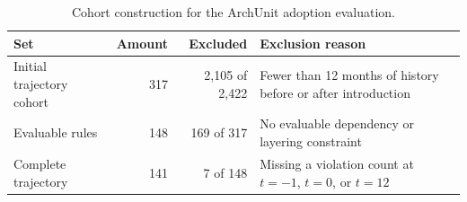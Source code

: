 \begin{table}[t]
\centering
\caption{Cohort construction for the ArchUnit adoption evaluation.}
\label{tab:rq4_cohort}
\small
\setlength{\tabcolsep}{8pt}
\setlength{\aboverulesep}{0pt}
\setlength{\belowrulesep}{0pt}
\renewcommand{\arraystretch}{1.25}
\begin{tabular}{@{}lrrl@{}}
\toprule
\textbf{Set} & \textbf{Amount} & \textbf{Excluded} & \textbf{Exclusion reason} \\
\midrule
\rowcolor{rowband}
Initial trajectory cohort & 317 & 2,105 of 2,422 &
Fewer than 12 months of history before or after introduction \\
Evaluable rules & 148 & 169 of 317 &
No evaluable dependency or layering constraint \\
\rowcolor{rowband}
Complete trajectory & 141 & 7 of 148 &
Missing a violation count at $t={-}1$, $t=0$, or $t=12$ \\
\bottomrule
\end{tabular}
\end{table}
